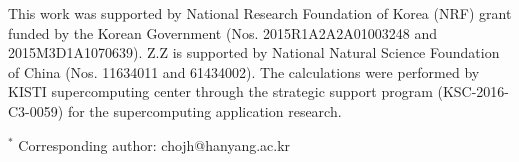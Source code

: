 \documentclass[aps,prl,twocolumn,showpacs,byrevtex]{revtex4}
\begin{document}
\vspace{0.4cm}

This work was supported by National Research Foundation of Korea (NRF) grant funded by the Korean Government (Nos. 2015R1A2A2A01003248 and 2015M3D1A1070639). Z.Z is supported by National Natural Science Foundation of China (Nos. 11634011 and 61434002). The calculations were performed by KISTI supercomputing center through the strategic support program (KSC-2016-C3-0059) for the supercomputing application research.



\noindent $^{*}$ Corresponding author: chojh@hanyang.ac.kr
\end{document}

